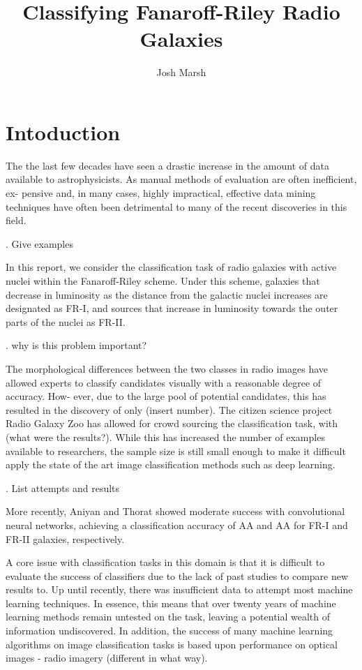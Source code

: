 \documentclass{article}
\begin{document}

\title{Classifying Fanaroff-Riley Radio Galaxies}
\author{Josh Marsh}

\maketitle

\section{\label{sec:level1}Intoduction}

The the last few decades have seen a drastic increase
in the amount of data available to astrophysicists. As
manual methods of evaluation are often inefficient, ex-
pensive and, in many cases, highly impractical, effective
data mining techniques have often been detrimental to
many of the recent discoveries in this field.

. Give examples

In this report, we consider the classification task of radio galaxies with active nuclei within the Fanaroff-Riley
scheme. Under this scheme, galaxies that decrease in luminosity as the distance from the galactic nuclei increases are designated as FR-I, and sources that increase in luminosity towards the outer parts of the nuclei as FR-II.

. why is this problem important?

The morphological differences between the two classes
in radio images have allowed experts to classify candidates visually with a reasonable degree of accuracy. How-
ever, due to the large pool of potential candidates, this
has resulted in the discovery of only (insert number). The
citizen science project Radio Galaxy Zoo has allowed for
crowd sourcing the classification task, with (what were
the results?). While this has increased the number of
examples available to researchers, the sample size is still
small enough to make it difficult apply the state of the
art image classification methods such as deep learning.

. List attempts and results

More recently, Aniyan and Thorat showed moderate
success with convolutional neural networks, achieving a
classification accuracy of AA and AA for FR-I and FR-II
galaxies, respectively.

A core issue with classification tasks in this domain is
that it is difficult to evaluate the success of classifiers due to the lack of past studies to compare new results to. Up until recently, there was insufficient data to attempt most machine learning techniques. In essence, this means that over twenty years of machine learning methods remain
untested on the task, leaving a potential wealth of information undiscovered. In addition, the success of many
machine learning algorithms on image classification tasks
is based upon performance on optical images - radio imagery (different in what way).
\end{document}
